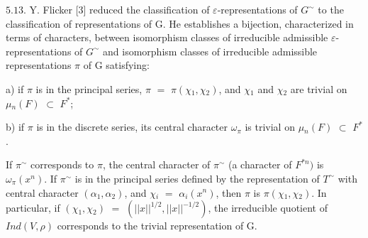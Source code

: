 \documentclass[10pt,a4paper]{article}
\begin{document}
\par $5.13$. Y. Flicker [3] reduced the classification of $\varepsilon{}$-representations of $G^\sim$ to the classification of representations of G. He establishes a bijection, characterized in terms of characters, between isomorphism classes of irreducible admissible $\varepsilon{}$-representations of $G^\sim$ and isomorphism classes of irreducible admissible representations $\pi{}$ of G satisfying:\par
\par a) if $\pi{}$ is in the principal series, $\pi{}$ $=$ $\pi{}(\chi{}_1,\chi{}_2)$, and $\chi{}_1$ and $\chi{}_2$ are trivial on $\mu{}_n(F)$ $\subset{}$ $F^*$;\par
\par b) if $\pi{}$ is in the discrete series, its central character $\omega{}_\pi{}$ is trivial on $\mu{}_n(F)$ $\subset{}$ $F^*$.\par
\par If $\pi{}^\sim$ corresponds to $\pi{}$, the central character of $\pi{}^\sim$ (a character of $F^{*n})$ is $\omega{}_\pi{}(x^n)$. If $\pi{}^\sim$ is in the principal series defined by the representation of $T^\sim$ with central character $(\alpha{}_1,\alpha{}_2)$, and $\chi{}_i$ $=$ $\alpha{}_i(x^n)$, then $\pi{}$ is $\pi{}(\chi{}_1,\chi{}_2)$. In particular, if $(\chi{}_1,\chi{}_2)$ $=$ $(||x||^{1/2},||x||^{-1/2})$, the irreducible quotient of $Ind(V,\rho{})$ corresponds to the trivial representation of G.\par
\end{document}
